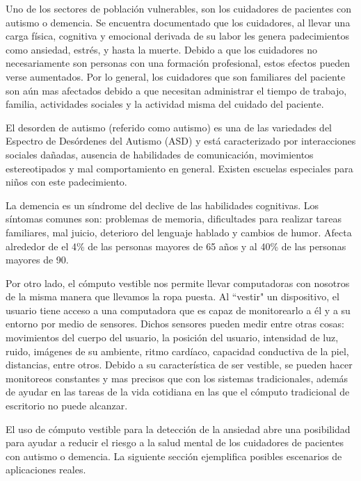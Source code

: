 \documentclass[letterpaper,12pt]{cicese}
\begin{document}
			Uno de los sectores de poblaci\'on vulnerables, son los cuidadores de pacientes con autismo o demencia. Se encuentra documentado que los cuidadores, al llevar una carga f\'isica, cognitiva y emocional derivada de su labor les genera padecimientos como ansiedad, estr\'es, y hasta la muerte\citep{Chen2013}. Debido a que los cuidadores no necesariamente son personas con una formaci\'on profesional, estos efectos pueden verse aumentados. Por lo general, los cuidadores que son familiares del paciente son a\'un mas afectados debido a que necesitan administrar el tiempo de trabajo, familia, actividades sociales y la actividad misma del cuidado del paciente.

			El desorden de autismo (referido como autismo) es una de las variedades del Espectro de Des\'ordenes del Autismo (ASD) y est\'a caracterizado por interacciones sociales da\~nadas, ausencia de habilidades de comunicaci\'on, movimientos estereotipados y mal comportamiento en general\citep{bernier2010autism}. Existen escuelas especiales para ni\~nos con este padecimiento. 

La demencia es un s\'indrome del declive de las habilidades cognitivas. Los s\'intomas comunes son: problemas de memoria, dificultades para realizar tareas familiares, mal juicio, deterioro del lenguaje hablado y cambios de humor\citep{Aziz}. Afecta alrededor de el 4\% de las personas mayores de 65 a\~nos y al 40\% de las personas mayores de 90. 

			Por otro lado, el c\'omputo vestible nos permite llevar computadoras con nosotros de la misma manera que llevamos la ropa puesta. Al ``vestir" un dispositivo,
			el usuario tiene acceso a una computadora que es capaz de monitorearlo a \'el y a su entorno por medio de sensores. Dichos sensores pueden medir entre
			otras cosas: movimientos del cuerpo del usuario, la posici\'on del usuario, intensidad de luz, ruido, im\'agenes de su ambiente, ritmo card\'iaco, capacidad
			conductiva de la piel, distancias, entre otros. Debido a su caracter\'istica de ser vestible, se pueden hacer monitoreos constantes y mas precisos que con
			los sistemas tradicionales, adem\'as de ayudar en las tareas de la vida cotidiana en las que el c\'omputo tradicional de escritorio no puede alcanzar.

			El uso de c\'omputo vestible para la detecci\'on de la ansiedad abre una posibilidad para ayudar a reducir el riesgo a la salud mental
			de los cuidadores de pacientes con autismo o demencia. La siguiente secci\'on ejemplifica posibles escenarios de aplicaciones reales.
\end{document}

